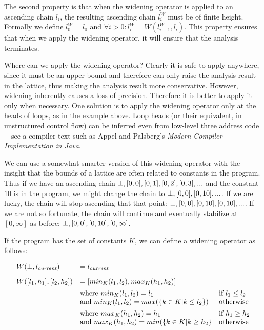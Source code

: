 \documentclass[11pt]{article}
\begin{document}
\begin{sloppypar}
The second property is that when the widening operator is applied to an ascending chain ${ l_i }$, the resulting ascending chain ${ l_i^W }$ must be of finite height.  Formally we define $l_0^W = l_0$ and $\forall i > 0 : l_i^W = W(l_{i-1}^W, l_i)$.  This property ensures that when we apply the widening operator, it will ensure that the analysis terminates.

Where can we apply the widening operator?  Clearly it is safe to apply anywhere, since it must be an upper bound and therefore can only raise the analysis result in the lattice, thus making the analysis result more conservative.  However, widening inherently causes a loss of precision.  Therefore it is better to apply it only when necessary.  One solution is to apply the widening operator only at the heads of loops, as in the example above.  Loop heads (or their equivalent, in unstructured control flow) can be inferred even from low-level three address code---see a compiler text such as Appel and Palsberg's \textit{Modern Compiler Implementation in Java}.

We can use a somewhat smarter version of this widening operator with the insight that the bounds of a lattice are often related to constants in the program.  Thus if we have an ascending chain $\bot, [0,0], [0,1], [0,2], [0,3], ...$ and the constant $10$ is in the program, we might change the chain to $\bot, [0,0], [0,10], ...$.  If we are lucky, the chain will stop ascending that that point: $\bot, [0,0], [0,10], [0, 10], ...$.  If we are not so fortunate, the chain will continue and eventually stabilize at $[0,\infty]$ as before: $\bot, [0,0], [0,10], [0,\infty]$.

If the program has the set of constants $K$, we can define a widening operator as follows:

\[
\begin{array}{lll}

W(\bot,l_\textit{current}) & = l_\textit{current} \\[2ex]
W([l_1,h_1],[l_2,h_2]) & = [min_K(l_1, l_2), max_K(h_1, h_2)] \\[1ex]
& \mbox{where}~ min_K(l_1, l_2) = l_1 & \mbox{if}~ l_1 \le l_2 \\
& \mbox{and}~ min_K(l_1, l_2) = max(\{k \in K | k \le l_2\}) & \mbox{otherwise} \\[1ex]
& \mbox{where}~ max_K(h_1, h_2) = h_1 & \mbox{if}~ h_1 \ge h_2 \\
& \mbox{and}~ max_K(h_1, h_2) = min(\{k \in K | k \ge h_2\} & \mbox{otherwise} \\


\end{array}\]
\end{sloppypar}
\end{document}
